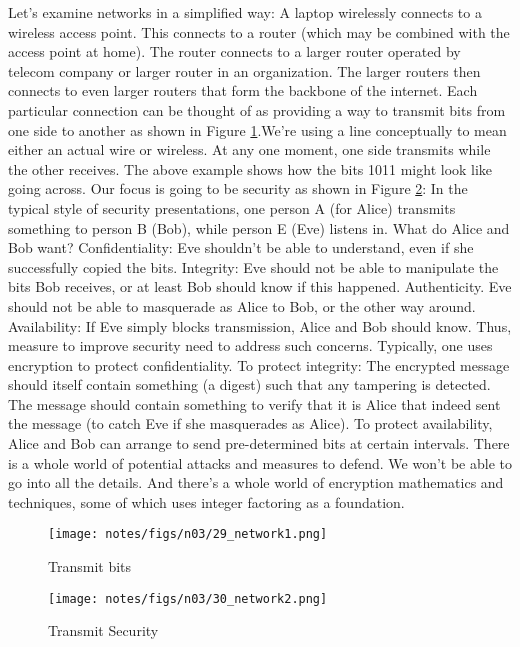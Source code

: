 \documentclass[main.tex]{subfiles}
\begin{document}
Let's examine networks in a simplified way: A laptop wirelessly connects to a wireless access point. This connects to a router (which may be combined with the access point at home). The router connects to a larger router operated by telecom company or larger router in an organization. The larger routers then connects to even larger routers that form the backbone of the internet. Each particular connection can be thought of as providing a way to transmit bits from one side to another as shown in Figure \ref{fig29:transmit_bits}.We're using a line conceptually to mean either an actual wire or wireless. At any one moment, one side transmits while the other receives. The above example shows how the bits 1011 might look like going across. Our focus is going to be security as shown in Figure \ref{fig30:transmit_security}: In the typical style of security presentations, one person A (for Alice) transmits something to person B (Bob), while person E (Eve) listens in. What do Alice and Bob want? Confidentiality: Eve shouldn't be able to understand, even if she successfully copied the bits. Integrity: Eve should not be able to manipulate the bits Bob receives, or at least Bob should know if this happened. Authenticity. Eve should not be able to masquerade as Alice to Bob, or the other way around. Availability: If Eve simply blocks transmission, Alice and Bob should know. Thus, measure to improve security need to address such concerns.
Typically, one uses encryption to protect confidentiality.
To protect integrity: The encrypted message should itself contain something (a digest) such that any tampering is detected. The message should contain something to verify that it is Alice that indeed sent the message (to catch Eve if she masquerades as Alice). To protect availability, Alice and Bob can arrange to send pre-determined bits at certain intervals. There is a whole world of potential attacks and measures to defend. We won't be able to go into all the details. And there's a whole world of encryption mathematics and techniques, some of which uses integer factoring as a foundation.\\

\begin{figure}
    \centering
    \texttt{[image: notes/figs/n03/29\_network1.png]}
    \caption{Transmit bits}
    \label{fig29:transmit_bits}
\end{figure}

\begin{figure}
    \centering
    \texttt{[image: notes/figs/n03/30\_network2.png]}
    \caption{Transmit Security}
    \label{fig30:transmit_security}
\end{figure}
\end{document}
